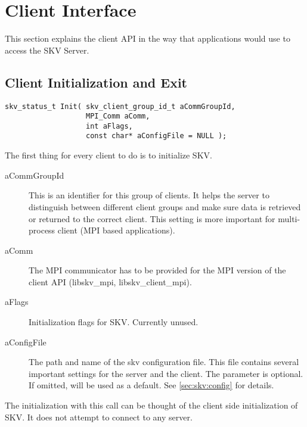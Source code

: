 %

\section{Client Interface}\label{sec:api}
This section explains the client API in the way that applications
would use to access the SKV Server.

\subsection{Client Initialization and Exit}\label{sec:api:init}
\begin{lstlisting}
skv_status_t Init( skv_client_group_id_t aCommGroupId,
                   MPI_Comm aComm,
                   int aFlags,
                   const char* aConfigFile = NULL );
\end{lstlisting}

The first thing for every client to do is to initialize SKV.
\begin{description}
\item[aCommGroupId] This is an identifier for this group of clients.
  It helps the server to distinguish between different client groups
  and make sure data is retrieved or returned to the correct client.
  This setting is more important for multi-process client (\abrEG MPI
  based applications).
\item[aComm] The MPI communicator has to be provided for the MPI
  version of the client API (libskv\_mpi, libskv\_client\_mpi).
\item[aFlags] Initialization flags for SKV. Currently unused.
\item[aConfigFile] The path and name of the skv configuration file.
  This file contains several important settings for the server and the
  client.  The parameter is optional.  If omitted,
   will be used as a default.  See
  \ref{sec:skv:config} for details.
\end{description}
The initialization with this call can be thought of the client side
initialization of SKV.  It does not attempt to connect to any server.

